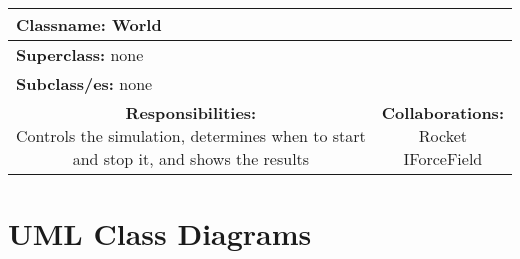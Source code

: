 \documentclass{article}
\begin{document}
\begin {center}
\begin{tabular}{|c|c|}
\hline
\multicolumn{2}{|l|}{\textbf{Classname:} World}\\
\hline
\multicolumn{2}{|l|}{\textbf{Superclass:} none}\\
\multicolumn{2}{|l|}{\textbf{Subclass/es:} none}\\
\hline
\parbox[]{5cm}{\vspace{3px}\textbf{Responsibilities:} \\Controls the simulation, determines when to start and stop it, and shows the results\vspace{3px}} & \parbox[]{5cm}{\textbf{Collaborations:}\\Rocket\\IForceField}\\
\hline
 \end{tabular}\vspace{.4cm}

\end{center}

\section{UML Class Diagrams}
\end{document}
